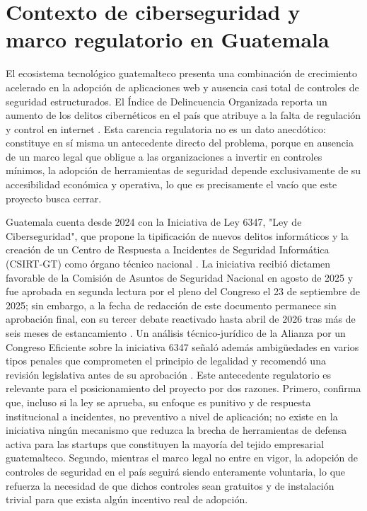 \section{Contexto de ciberseguridad y marco regulatorio en Guatemala}
El ecosistema tecnológico guatemalteco presenta una combinación de crecimiento acelerado en la
adopción de aplicaciones web y ausencia casi total de controles de seguridad estructurados. El
Índice de Delincuencia Organizada reporta un aumento de los delitos cibernéticos en el país que atribuye a la falta de regulación y
control en internet \cite{lahora2025ley6347}. Esta carencia regulatoria no es un dato
anecdótico: constituye en sí misma un antecedente directo del problema, porque en ausencia de
un marco legal que obligue a las organizaciones a invertir en controles mínimos, la adopción de
herramientas de seguridad depende exclusivamente de su accesibilidad económica y operativa, lo
que es precisamente el vacío que este proyecto busca cerrar.

Guatemala cuenta desde 2024 con la Iniciativa de Ley 6347, "Ley de Ciberseguridad", que propone
la tipificación de nuevos delitos informáticos y la creación de un Centro de Respuesta a Incidentes
de Seguridad Informática (CSIRT-GT) como órgano técnico nacional \cite{congreso2025dictamen}.
La iniciativa recibió dictamen favorable de la Comisión de Asuntos de Seguridad Nacional en
agosto de 2025 y fue aprobada en segunda lectura por el pleno del Congreso el 23 de septiembre
de 2025; sin embargo, a la fecha de redacción de este documento permanece sin aprobación final,
con su tercer debate reactivado hasta abril de 2026 tras más de seis meses de estancamiento
\cite{lahora2026estancada}. Un análisis técnico-jurídico de la Alianza por un Congreso Eficiente sobre la iniciativa 6347 señaló
además ambigüedades en varios tipos penales que comprometen el principio de legalidad y recomendó
una revisión legislativa antes de su aprobación \cite{cien2025boletin}. Este antecedente
regulatorio es relevante para el posicionamiento del proyecto por dos razones. Primero, confirma
que, incluso si la ley se aprueba, su enfoque es punitivo y de respuesta institucional a incidentes,
no preventivo a nivel de aplicación; no existe en la iniciativa ningún mecanismo que reduzca la
brecha de herramientas de defensa activa para las startups que constituyen la mayoría del tejido
empresarial guatemalteco. Segundo, mientras el marco legal no entre en vigor, la adopción de
controles de seguridad en el país seguirá siendo enteramente voluntaria, lo que refuerza la
necesidad de que dichos controles sean gratuitos y de instalación trivial para que exista algún
incentivo real de adopción.

